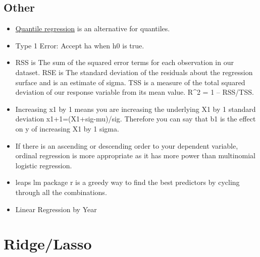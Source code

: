 \documentclass[]{book}
\newenvironment{Shaded}{\begin{snugshade}}{\end{snugshade}}
\newcommand{\KeywordTok}[1]{\textcolor[rgb]{0.13,0.29,0.53}{\textbf{#1}}}
\newcommand{\DataTypeTok}[1]{\textcolor[rgb]{0.13,0.29,0.53}{#1}}
\newcommand{\StringTok}[1]{\textcolor[rgb]{0.31,0.60,0.02}{#1}}
\newcommand{\OperatorTok}[1]{\textcolor[rgb]{0.81,0.36,0.00}{\textbf{#1}}}
\newcommand{\NormalTok}[1]{#1}
\theoremstyle{definition}
\theoremstyle{definition}
\theoremstyle{definition}
\theoremstyle{remark}
\begin{document}
\subsection{Other}\label{other-1}

\begin{itemize}
\item
  \href{https://en.wikipedia.org/wiki/Quantile_regression}{Quantile
  regression} is an alternative for quantiles.
\item
  Type 1 Error: Accept ha when h0 is true.
\item
  RSS is The sum of the squared error terms for each observation in our
  dataset. RSE is The standard deviation of the residuals about the
  regression surface and is an estimate of sigma. TSS is a measure of
  the total squared deviation of our response variable from its mean
  value. R\^{}2 = 1 -- RSS/TSS.
\item
  Increasing x1 by 1 means you are increasing the underlying X1 by 1
  standard deviation x1+1=(X1+sig-mu)/sig. Therefore you can say that b1
  is the effect on y of increasing X1 by 1 sigma.
\item
  If there is an ascending or descending order to your dependent
  variable, ordinal regression is more appropriate as it has more power
  than multinomial logistic regression.
\item
  leaps lm package r is a greedy way to find the best predictors by
  cycling through all the combinations.
\item
  Linear Regression by Year
\end{itemize}

\begin{Shaded}
\end{Shaded}

\section{Ridge/Lasso}\label{ridgelasso}
\end{document}
